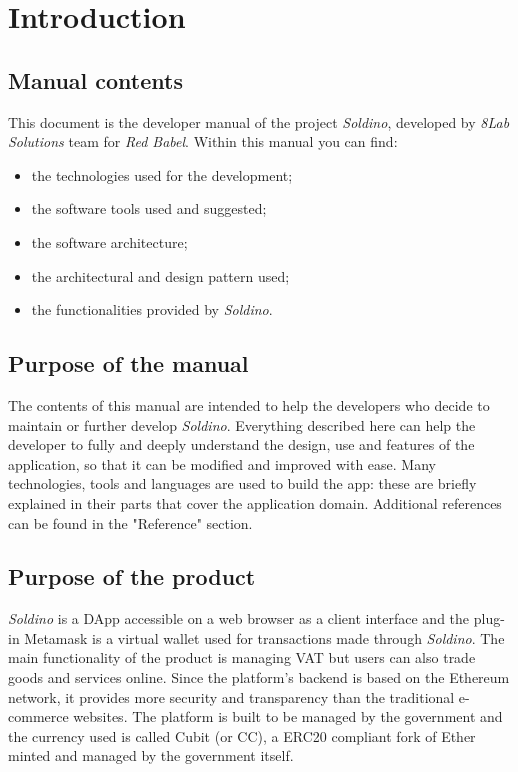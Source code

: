 \section{Introduction} 
\subsection{Manual contents}
This document is the developer manual of the project \textit{Soldino}, developed by \textit{8Lab Solutions} team for \textit{Red Babel}.\newline
Within this manual you can find:
\begin{itemize}
	\item the technologies used for the development;
	\item the software tools used and suggested;
	\item the software architecture;
	\item the architectural and design pattern used;
	\item the functionalities provided by \textit{Soldino}.
\end{itemize}

\subsection{Purpose of the manual}
The contents of this manual are intended to help the developers who decide to 
maintain or further develop \textit{Soldino}. Everything described here can 
help the developer to fully and deeply understand the design, use and features 
of the application, so that it can be modified and improved with ease.\newline
Many technologies, tools and languages are used to build the app: these are 
 briefly explained in their parts that cover the application domain. 
Additional references can be found in the "Reference" section.

\subsection{Purpose of the product}
\textit{Soldino} is a DApp accessible on a web browser as a 
client interface and the plug-in Metamask is a virtual wallet used for 
transactions made through \textit{Soldino}.\newline
The main functionality of the product is managing VAT but users can also
trade goods and services online. Since the platform's backend is based on the 
Ethereum network, it provides more security and transparency than the 
traditional e-commerce websites.\newline
The platform is built to be managed by the government and the currency used is 
called Cubit (or CC), a ERC20 compliant fork of Ether minted and managed by 
the government itself.

